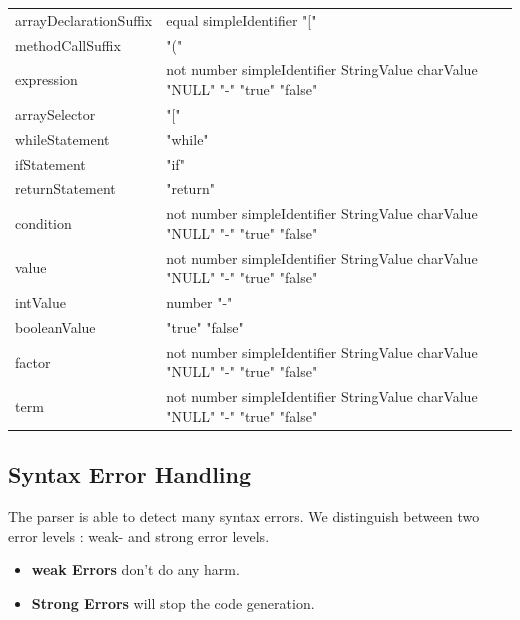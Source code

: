\begin{tabularx}{\linewidth}{YY}
arrayDeclarationSuffix & equal simpleIdentifier "[" \\
methodCallSuffix & "(" \\
expression & not number simpleIdentifier StringValue charValue "NULL" "-" "true" "false" \\
arraySelector & "[" \\
whileStatement & "while" \\
ifStatement & "if" \\
returnStatement & "return" \\
condition & not number simpleIdentifier StringValue charValue "NULL" "-" "true" "false" \\
value & not number simpleIdentifier StringValue charValue "NULL" "-" "true" "false" \\
intValue & number "-" \\
booleanValue & "true" "false" \\
factor & not number simpleIdentifier StringValue charValue "NULL" "-" "true" "false" \\
term & not number simpleIdentifier StringValue charValue "NULL" "-" "true" "false" \\
\end{tabularx}
%

\newpage
\subsection{Syntax Error Handling}
The parser is able to detect many syntax errors. We distinguish between two error levels : weak- and strong error levels.
\begin{itemize}
  \item \textbf{weak Errors} don't do any harm. 
  \item \textbf{Strong Errors} will stop the code generation. 
\end{itemize}


